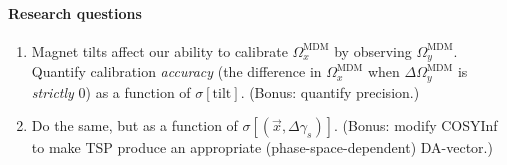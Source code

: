 \documentclass{article}
\newcommand{\MDM}{{\text{MDM}}}
\begin{document}
\paragraph{Research questions}
\begin{enumerate}
	\item Magnet tilts affect our ability to calibrate $\Omega_x^\MDM$ by observing $\Omega_y^\MDM$. Quantify calibration \emph{accuracy} (the difference in $\Omega_x^\MDM$ when $\Delta\Omega_y^\MDM$ is \emph{strictly} 0) as a function of $\sigma[\text{tilt}]$. (Bonus: quantify precision.)
	\item Do the same, but as a function of $\sigma[(\vec{x},\Delta\gamma_s)]$. (Bonus: modify COSYInf to make TSP produce an appropriate (phase-space-dependent) DA-vector.)
\end{enumerate}
\end{document}
